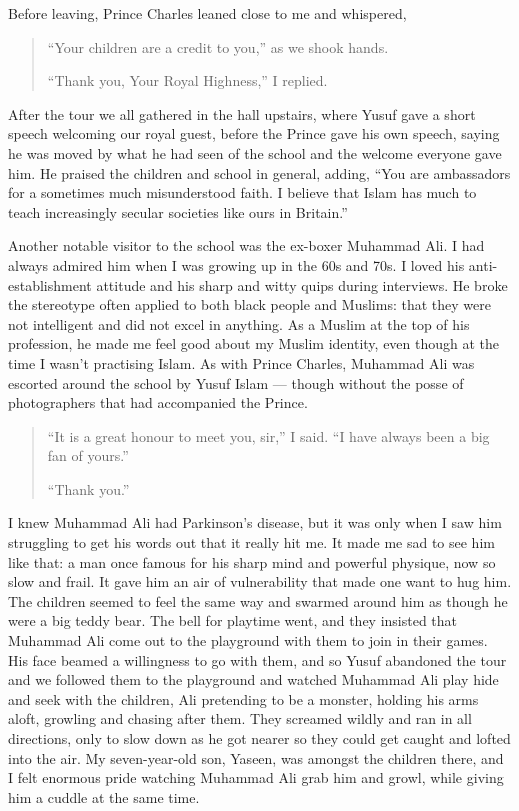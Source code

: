 \documentclass[12pt]{memoir}
\newcommand{\cor}[2]{#2} %
\def\–{-\hskip0pt}
\begin{document}
Before leaving, Prince Charles leaned close to me and whispered,

\begin{quote}
“Your children are a credit to you,” as we shook hands.

“Thank you, Your Royal Highness,” I replied.
\end{quote}

After the tour we all gathered in the hall upstairs,
where Yusuf gave a short speech welcoming our royal guest,
before the Prince gave his own speech,
saying he was moved by what he had seen of the school
and the welcome everyone gave him.
He praised the children and school in general, adding,
“You are ambassadors for a sometimes much misunderstood faith.
I believe that Islam has much to teach increasingly secular societies
like ours in Britain.”

Another notable visitor to the school was the ex-boxer Muhammad Ali.
I had always admired him when I was growing up in the 60s and 70s.
I loved his anti\–establishment attitude
and his sharp and witty quips during interviews.
He broke the stereotype often applied to both black people and Muslims:
that they were not intelligent and did not excel in anything.
As a Muslim at the top of his profession,
he made me feel good about my Muslim identity,
even though at the time I wasn’t practising Islam.
As with Prince Charles, Muhammad Ali was escorted around the school
by Yusuf Islam — though without the posse of photographers
that had accompanied the Prince.

\begin{quote}
“It is a great honour to meet you, sir,” I said.
“I have always been a big fan of yours.”

“Thank you.”
\end{quote}

I knew Muhammad Ali had Parkinson’s disease,
but it was only when I saw him struggling to get his words out
that it really hit me.
It made me sad to see him like that: a man once famous for his sharp mind
and powerful physique, now so slow and frail.
It gave him an air of vulnerability that made one want to hug him.
The children seemed to feel the same way and swarmed around him
as though he were a big teddy bear.
The bell for playtime went, and they insisted that Muhammad Ali
come out to the playground with them to join in their games.
His face beamed a willingness to go with them,
and so Yusuf abandoned the tour and we followed them to the playground
and watched Muhammad Ali play hide and seek with the children,
Ali pretending to be a monster, holding his arms aloft,
growling and chasing after them.
They screamed wildly and ran in all directions, only to slow down
as he got nearer so they could get caught and lofted into the air.
My seven-year-old son, Yaseen, was amongst the children there,
and I felt enormous pride watching Muhammad Ali grab him and growl,
while giving him a cuddle at the same time.
\end{document}
